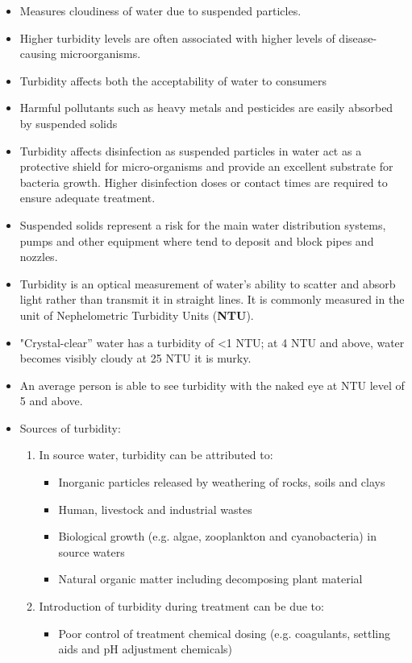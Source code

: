 \begin{itemize}
\item Measures cloudiness of water due to suspended particles.
\item Higher turbidity levels are often associated with higher levels of disease-causing microorganisms.
\item Turbidity affects both the acceptability of water to consumers
\item Harmful pollutants such as heavy metals and pesticides are easily absorbed by suspended solids
\item Turbidity affects disinfection as suspended particles in water act as a protective shield for micro-organisms and provide an excellent substrate for bacteria growth.  Higher disinfection doses or contact times are required to ensure adequate treatment.
\item Suspended solids represent a risk for the main water distribution systems, pumps and other equipment where tend to deposit and block pipes and nozzles.
\item Turbidity is an optical measurement of water's ability to scatter and absorb light rather than transmit it in straight lines.  It is commonly measured in the unit of Nephelometric Turbidity Units (\textbf{NTU}). 
\item "Crystal-clear” water has a turbidity of <1 NTU; at 4 NTU and above, water becomes visibly cloudy at 25 NTU it is murky.
\item An average person is able to see turbidity with the naked eye at NTU level of 5 and above.
\item Sources of turbidity:
\begin{enumerate}
\item In source water, turbidity can be attributed to:
\begin{itemize}
\item Inorganic particles released by weathering of rocks, soils and clays
\item Human, livestock and industrial wastes
\item Biological growth (e.g. algae, zooplankton and cyanobacteria) in source waters
\item Natural organic matter including decomposing plant material
\end{itemize}
\item Introduction of turbidity during treatment can be due to:
\begin{itemize}
\item Poor control of treatment chemical dosing (e.g. coagulants, settling aids and pH adjustment chemicals)

\end{itemize}
\end{enumerate}
\end{itemize}
